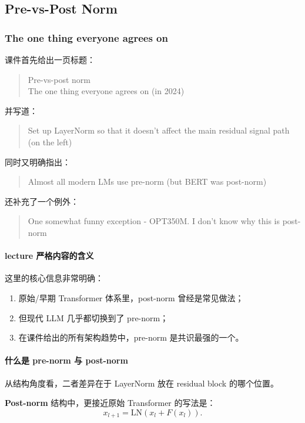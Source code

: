 \documentclass[a4paper,UTF8]{article}
\numberwithin{equation}{section}
\begin{document}
\subsection{Pre-vs-Post Norm}

\subsubsection{The one thing everyone agrees on}

课件首先给出一页标题：
\begin{quote}
Pre-vs-post norm \\
The one thing everyone agrees on (in 2024)
\end{quote}

并写道：
\begin{quote}
Set up LayerNorm so that it doesn’t affect the main residual signal path (on the left)
\end{quote}

同时又明确指出：
\begin{quote}
Almost all modern LMs use pre-norm (but BERT was post-norm)
\end{quote}

还补充了一个例外：
\begin{quote}
One somewhat funny exception - OPT350M. I don’t know why this is post-norm
\end{quote}

\paragraph{lecture 严格内容的含义}
这里的核心信息非常明确：

\begin{enumerate}
    \item 原始/早期 Transformer 体系里，post-norm 曾经是常见做法；
    \item 但现代 LLM 几乎都切换到了 pre-norm；
    \item 在课件给出的所有架构趋势中，pre-norm 是共识最强的一个。
\end{enumerate}

\paragraph{什么是 pre-norm 与 post-norm}
从结构角度看，二者差异在于 LayerNorm 放在 residual block 的哪个位置。

\textbf{Post-norm} 结构中，更接近原始 Transformer 的写法是：
\[
x_{l+1} = \mathrm{LN}(x_l + F(x_l)).
\]
\end{document}
